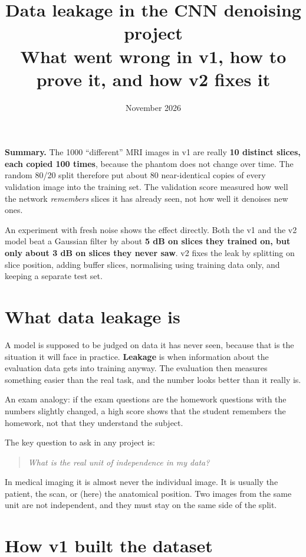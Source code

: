 \documentclass[11pt,a4paper]{article}
\title{\color{accent}\textbf{Data leakage in the CNN denoising project}\\[4pt]
\large What went wrong in v1, how to prove it, and how v2 fixes it}
\author{}
\date{November 2026}
\newcommand{\keybox}[1]{%
  \par\noindent\colorbox{boxbg}{\parbox{\dimexpr\linewidth-2\fboxsep}{\vspace{4pt}#1\vspace{4pt}}}\par}
\begin{document}
\maketitle
\vspace{-1em}

\keybox{\textbf{Summary.}
The 1000 ``different'' MRI images in v1 are really \textbf{10 distinct slices, each copied 100 times}, because the
phantom does not change over time. The random 80/20 split therefore put about 80 near-identical copies of
every validation image into the training set. The validation score measured how well the network
\emph{remembers} slices it has already seen, not how well it denoises new ones.

An experiment with fresh noise shows the effect directly. Both the v1 and the v2 model beat a Gaussian filter by
about \textbf{5 dB on slices they trained on, but only about 3 dB on slices they never saw}. v2 fixes the leak by
splitting on slice position, adding buffer slices, normalising using training data only, and keeping a
separate test set.}

\section{What data leakage is}

A model is supposed to be judged on data it has never seen, because that is the situation it will face in practice.
\textbf{Leakage} is when information about the evaluation data gets into training anyway. The evaluation then
measures something easier than the real task, and the number looks better than it really is.

An exam analogy: if the exam questions are the homework questions with the numbers slightly changed, a high score
shows that the student remembers the homework, not that they understand the subject.

The key question to ask in any project is:
\begin{quote}
\emph{What is the real unit of independence in my data?}
\end{quote}
In medical imaging it is almost never the individual image. It is usually the patient, the scan, or (here) the
anatomical position. Two images from the same unit are not independent, and they must stay on the same
side of the split.

\section{How v1 built the dataset}
\end{document}
